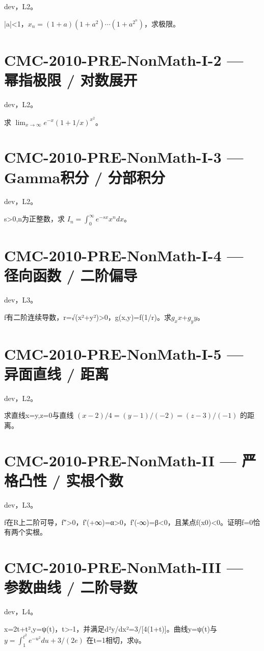 \documentclass[UTF8]{ctexart}
\begin{document}
dev，L2。

|a|<1，$x_n=(1+a)(1+a^2)\cdots(1+a^{2^n})$，求极限。

\section*{CMC-2010-PRE-NonMath-I-2 — 幂指极限 / 对数展开}

dev，L2。

求 $\lim_{x\to\infty}e^{-x}(1+1/x)^{x^2}$。

\section*{CMC-2010-PRE-NonMath-I-3 — Gamma积分 / 分部积分}

dev，L2。

s>0,n为正整数，求 $I_n=\int_0^\infty e^{-sx}x^n dx$。

\section*{CMC-2010-PRE-NonMath-I-4 — 径向函数 / 二阶偏导}

dev，L3。

f有二阶连续导数，r=√(x²+y²)>0，g(x,y)=f(1/r)。求$g_xx$+$g_yy$。

\section*{CMC-2010-PRE-NonMath-I-5 — 异面直线 / 距离}

dev，L2。

求直线x=y,z=0与直线 $(x-2)/4=(y-1)/(-2)=(z-3)/(-1)$ 的距离。

\section*{CMC-2010-PRE-NonMath-II — 严格凸性 / 实根个数}

dev，L3。

f在R上二阶可导，f″>0，f′(+∞)=α>0，f′(-∞)=β<0，且某点f(x0)<0。证明f=0恰有两个实根。

\section*{CMC-2010-PRE-NonMath-III — 参数曲线 / 二阶导数}

dev，L4。

x=2t+t²,y=ψ(t)，t>-1，并满足d²y/dx²=3/[4(1+t)]。曲线y=ψ(t)与 $y=\int_1^{t^2}e^{-u^2}du+3/(2e)$ 在t=1相切，求ψ。
\end{document}
